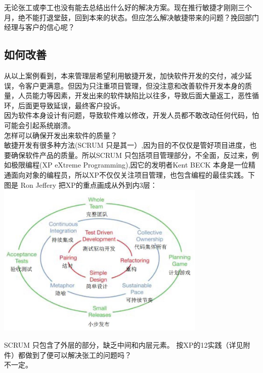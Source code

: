 无论张工或李工也没有能去总结出什么好的解决方案。现在推行敏捷才刚刚三个月，绝不能打退堂鼓，回到本来的状态。但应怎么解决敏捷带来的问题？挽回部门经理与客户的信心呢？\\
\hypertarget{ux5982ux4f55ux6539ux5584}{%
\subsection{如何改善}\label{ux5982ux4f55ux6539ux5584}}

从以上案例看到，本来管理层希望利用敏捷开发，加快软件开发的交付，减少延误，令客户更满意。但因为只注重项目管理，但没注意和改善软件开发本身的质量，人员能力等因素，开发出来的软件缺陷比以往多，导致后面大量返工，恶性循环，后面更导致延误，最终客户投诉。\\
因为软件本身设计有问题，导致软件难以修改，开发人员都不敢改动任何代码，怕可能会引起系统崩溃。\\

怎样可以确保开发出来软件的质量？\\

敏捷开发有很多种方法(SCRUM 只是其一）,因为目的不仅仅是管好项目进度，也要确保软件产品的质量。所以SCRUM 只包括项目管理部分，不全面，反过来，例如极限编程(XP eXtreme Programming),因它的发明者Kent BECK 本身是一位精通面向对象的编程员，所以XP不仅仅关注项目管理，也包含编程的最佳实践。下图是 Ron Jeffery 把XP的重点画成从外到内3层： \\



\includegraphics[width=10cm]{cleanagile_f18.jpg}

SCRUM 只包含了外层的部分，缺乏中间和内层元素。
按XP的12实践（详见附件）都做到了便可以解决张工的问题吗？\\
不一定。

